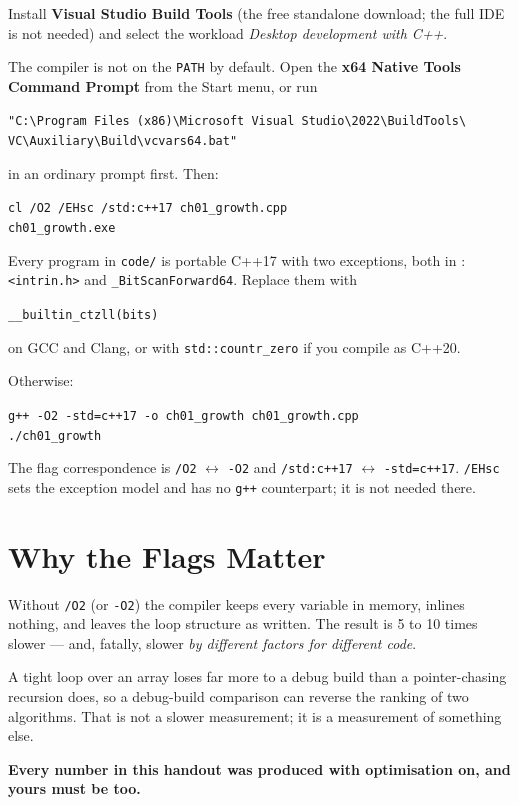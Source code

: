 \begin{conceptbox}
Install \textbf{Visual Studio Build Tools} (the free standalone download; the
full IDE is not needed) and select the workload \emph{Desktop development with
C++}.

\smallskip
The compiler is not on the \texttt{PATH} by default. Open the
\textbf{x64 Native Tools Command Prompt} from the Start menu, or run
\begin{center}
\texttt{"C:\textbackslash Program Files (x86)\textbackslash Microsoft Visual
Studio\textbackslash 2022\textbackslash BuildTools\textbackslash
VC\textbackslash Auxiliary\textbackslash Build\textbackslash vcvars64.bat"}
\end{center}
in an ordinary prompt first. Then:
\begin{center}
\texttt{cl /O2 /EHsc /std:c++17 ch01\_growth.cpp}\\
\texttt{ch01\_growth.exe}
\end{center}
\end{conceptbox}

\begin{conceptbox}
Every program in \texttt{code/} is portable C++17 with two exceptions, both in
: \texttt{<intrin.h>} and \texttt{\_BitScanForward64}. Replace
them with
\begin{center}
\texttt{\_\_builtin\_ctzll(bits)}
\end{center}
on GCC and Clang, or with \texttt{std::countr\_zero} if you compile as C++20.

\smallskip
Otherwise:
\begin{center}
\texttt{g++ -O2 -std=c++17 -o ch01\_growth ch01\_growth.cpp}\\
\texttt{./ch01\_growth}
\end{center}

\smallskip
The flag correspondence is \texttt{/O2} $\leftrightarrow$ \texttt{-O2} and
\texttt{/std:c++17} $\leftrightarrow$ \texttt{-std=c++17}. \texttt{/EHsc} sets
the exception model and has no \texttt{g++} counterpart; it is not needed
there.
\end{conceptbox}

\section{Why the Flags Matter}

\begin{alertbox}
Without \texttt{/O2} (or \texttt{-O2}) the compiler keeps every variable in
memory, inlines nothing, and leaves the loop structure as written. The result
is 5 to 10 times slower --- and, fatally, slower \emph{by different factors for
different code}.

\smallskip
A tight loop over an array loses far more to a debug build than a
pointer-chasing recursion does, so a debug-build comparison can reverse the
ranking of two algorithms. That is not a slower measurement; it is a
measurement of something else.

\smallskip
\textbf{Every number in this handout was produced with optimisation on, and
yours must be too.}
\end{alertbox}

